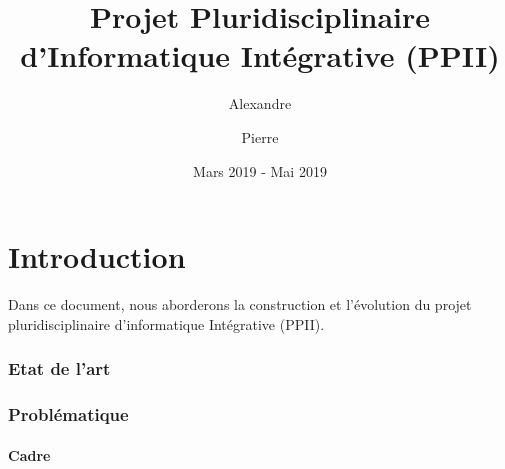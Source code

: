 \documentclass{article}
\title{Projet Pluridisciplinaire d'Informatique Intégrative (PPII)}
\author{
        Alexandre \sc{Cesari}
        \and
        Pierre \sc{Bouillon}
    }
\date{Mars 2019 - Mai 2019}
\begin{document}
    \maketitle

    \newpage


    \tableofcontents{}

    \newpage


    \part*{Introduction}

    Dans ce document, nous aborderons la construction et l'évolution du projet pluridisciplinaire d'informatique Intégrative (PPII).

    \newpage


    \section{Etat de l'art}


    \newpage


    \section{Problématique}

    \subsection{Cadre}
\end{document}
